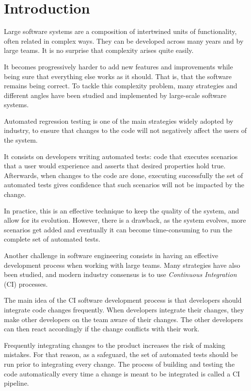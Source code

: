 \chapter{Introduction}

Large software systems are a composition of intertwined units of functionality,
often related in complex ways. They can be developed across many years and by 
large teams. It is no surprise that complexity arises quite easily. 

It becomes progressively harder to add new features and improvements while being 
sure that everything else works as it should. That is, that the software remains
being correct. To tackle this complexity problem, many strategies and different 
angles have been studied and implemented by large-scale software systems. 

Automated regression testing is one of the main strategies widely adopted by industry,
to ensure that changes to the code will not negatively affect the users of the system. 

It consists on developers writing automated tests: code that executes scenarios that a user would experience
and asserts that desired properties hold true. Afterwards, when changes to the code are done,
executing successfully the set of automated tests gives confidence that such scenarios will
not be impacted by the change.

In practice, this is an effective technique to keep the quality of the system, and
allow for its evolution. However, there is a drawback, as the system evolves, more
scenarios get added and eventually it can become time-consuming to run the complete
set of automated tests.

Another challenge in software engineering consists in having an effective development process when
working with large teams. Many strategies have also been studied, and modern industry 
consensus is to use \emph{Continuous Integration} (CI) processes.

The main idea of the CI software development process is that developers should
integrate code changes frequently. When developers integrate their changes,
they make other developers on the team aware of their changes. The other developers
can then react accordingly if the change conflicts with their work.

Frequently integrating changes to the product increases the risk of making mistakes.
For that reason, as a safeguard, the set of automated tests should be run prior to
integrating every change. The process of building and testing the code automatically
every time a change is meant to be integrated is called a CI pipeline.

